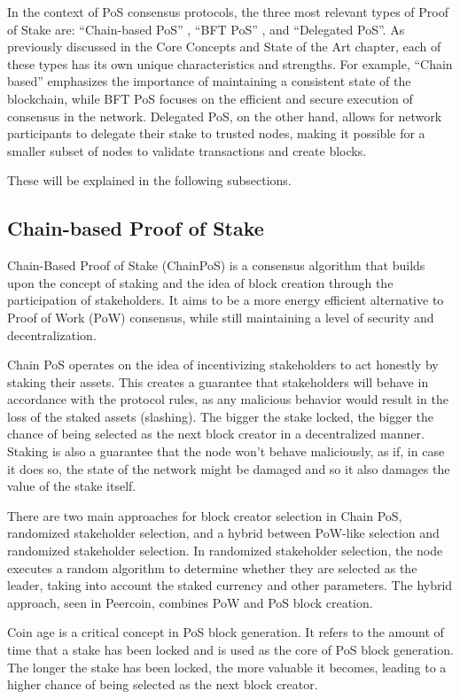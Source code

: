 In the context of PoS consensus protocols, the three most relevant types of Proof of Stake are: ``Chain-based PoS'' , ``BFT PoS'' , and ``Delegated PoS''. As previously discussed in the Core Concepts and State of the Art chapter, each of these types has its own unique characteristics and strengths. For example, ``Chain based'' emphasizes the importance of maintaining a consistent state of the blockchain, while BFT PoS focuses on the efficient and secure execution of consensus in the network. Delegated PoS, on the other hand, allows for network participants to delegate their stake to trusted nodes, making it possible for a smaller subset of nodes to validate transactions and create blocks.

These will be explained in the following subsections.

\subsection*{\textbf{Chain-based Proof of Stake}}
Chain-Based Proof of Stake (ChainPoS) is a consensus algorithm that builds upon the concept of staking and the idea of block creation through the participation of stakeholders. It aims to be a more energy efficient alternative to Proof of Work (PoW) consensus, while still maintaining a level of security and decentralization.

Chain PoS operates on the idea of incentivizing stakeholders to act honestly by staking their assets. This creates a guarantee that stakeholders will behave in accordance with the protocol rules, as any malicious behavior would result in the loss of the staked assets (slashing). The bigger the stake locked, the bigger the chance of being selected as the next block creator in a decentralized manner.
Staking is also a guarantee that the node won't behave maliciously, as if, in case it does so, the state of the network might be damaged and so it also damages the value of the stake itself.

There are two main approaches for block creator selection in Chain PoS, randomized stakeholder selection, and a hybrid between PoW-like selection and randomized stakeholder selection. In randomized stakeholder selection, the node executes a random algorithm to determine whether they are selected as the leader, taking into account the staked currency and other parameters. The hybrid approach, seen in Peercoin, combines PoW and PoS block creation.

Coin age is a critical concept in PoS block generation. It refers to the amount of time that a stake has been locked and is used as the core of PoS block generation. The longer the stake has been locked, the more valuable it becomes, leading to a higher chance of being selected as the next block creator.

